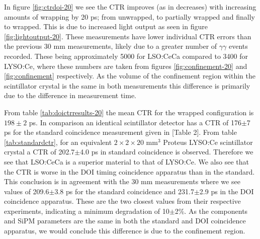 In figure \ref{fig:ctrdoi-20} we see the CTR improves (as in decreases) with increasing amounts of wrapping by 20 ps; from unwrapped, to partially wrapped and finally to wrapped. This is due to increased light output as seen in figure \ref{fig:lightoutput-20}. These measurements have lower individual CTR errors than the previous 30 mm measurements, likely due to a greater number of $\gamma\gamma$ events recorded. These being approximately 5000 for LSO:CeCa compared to 3400 for LYSO:Ce, where these numbers are taken from figures \ref{fig:confinement-20} and \ref{fig:confinement} respectively. As the volume of the confinement region within the scintillator crystal is the same in both measurements this difference is primarily due to the difference in measurement time. 

From table \ref{tab:doictrresults-20} the mean CTR for the wrapped configuration is $198\pm2$ ps. In comparison an identical scintillator detector has a CTR of 176$\pm$7 ps for the standard coincidence measurement given in [Table 2]\cite{uffray_Jarron_Meyer_Lecoq_2014}. From table \ref{tab:standardctr}, for an equivalent $2\times2\times20$ mm$^3$ Proteus LYSO:Ce scintillator crystal a CTR of 202.7$\pm$4.0 ps in standard coincidence is observed. Therefore we see that LSO:CeCa is a superior material to that of LYSO:Ce. We also see that the CTR is worse in the DOI timing coincidence apparatus than in the standard. This conclusion is in agreement with the 30 mm measurements where we see values of 209.6$\pm$3.8 ps for the standard coincidence and 231.7$\pm$2.9 ps in the DOI coincidence apparatus. These are the two closest values from their respective experiments, indicating a minimum degradation of 10$\pm$2\%. As the components and SiPM parameters are the same in both the standard and DOI coincidence apparatus, we would conclude this difference is due to the confinement region.